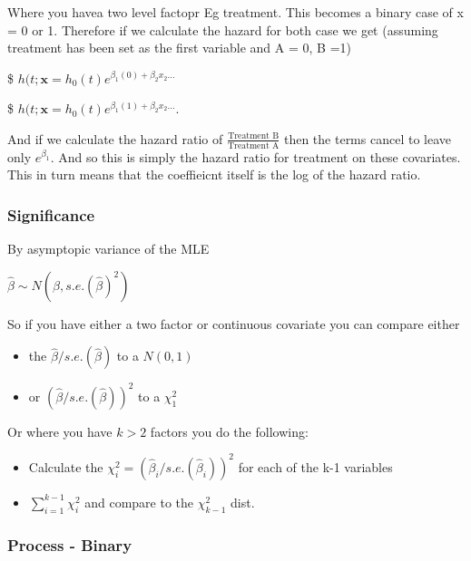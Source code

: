 \documentclass[
  letterpaper,
  DIV=11,
  numbers=noendperiod]{scrreprt}
\providecommand{\tightlist}{%
  \setlength{\itemsep}{0pt}\setlength{\parskip}{0pt}}\usepackage{longtable,booktabs,array}
\begin{document}
Where you havea two level factopr Eg treatment. This becomes a binary
case of x = 0 or 1. Therefore if we calculate the hazard for both case
we get (assuming treatment has been set as the first variable and A = 0,
B =1)

\$
\(h(t;\textbf{x} = h_0(t)e^{\beta_1(0) + \beta_2 x_2 ...}\)

\$
\(h(t;\textbf{x} = h_0(t)e^{\beta_1(1) + \beta_2 x_2 ...}\).

And if we calculate the hazard ratio of
\(\frac{\text{Treatment B}}{\text{Treatment A}}\) then the terms cancel
to leave only \(e^{\beta_1}\). And so this is simply the hazard ratio
for treatment on these covariates. This in turn means that the
coeffieicnt itself is the log of the hazard ratio.

\hypertarget{significance}{%
\subsubsection{Significance}\label{significance}}

By asymptopic variance of the MLE

\(\hat{\beta} \sim N(\beta, s.e.(\hat{\beta})^2)\)

So if you have either a two factor or continuous covariate you can
compare either

\begin{itemize}
\tightlist
\item
  the \(\hat{\beta}/s.e.(\hat{\beta})\) to a \(N(0,1)\)
\item
  or \((\hat{\beta}/s.e.(\hat{\beta}))^2\) to a \(\chi_1^2\)
\end{itemize}

Or where you have \(k >2\) factors you do the following:

\begin{itemize}
\tightlist
\item
  Calculate the \(\chi_i^2 = (\hat{\beta}_i/s.e.(\hat{\beta}_i))^2\) for
  each of the k-1 variables
\item
  \(\sum^{k-1}_{i=1}\chi_i^2\) and compare to the \(\chi_{k-1}^2\) dist.
\end{itemize}

\hypertarget{process---binary}{%
\subsubsection{Process - Binary}\label{process---binary}}
\end{document}
